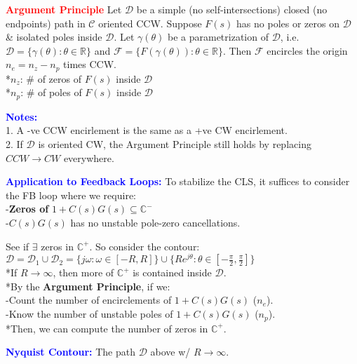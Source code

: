 \documentclass[5pt]{extarticle} %
\newcommand{\customFigure}[3][]{%
    \vspace{-1.5em}
    \begin{figure}[H]
        \centering
        \texttt{[image: \#2]}
    \end{figure}
    \vspace{-1.5em}
}
\begin{document}
\begin{paracol}{3}
{    \textcolor{red}{\textbf{Argument Principle}} Let $\mathcal{D}$ be a simple (no self-intersections) closed (no endpoints) path in $\mathcal{C}$ oriented CCW. 
    Suppose $F(s)$ has no poles or zeros on $\mathcal{D}$ \& isolated poles inside $\mathcal{D}$. Let $\gamma(\theta)$ be a parametrization of $\mathcal{D}$, i.e. $\mathcal{D} = \{ \gamma(\theta) : \theta \in \mathbb{R}\}$ 
    and $\mathcal{F} = \{F(\gamma(\theta)) : \theta \in \mathbb{R}\}$. Then $\mathcal{F}$ encircles the origin $n_e = n_z - n_p$ times CCW. \\
    *$n_z$: \# of zeros of $F(s)$ inside $\mathcal{D}$ \\
    *$n_p$: \# of poles of $F(s)$ inside $\mathcal{D}$ 

    \textcolor{blue}{\textbf{Notes:}} \\
    1. A -ve CCW encirlement is the same as a +ve CW encirlement. \\    
    2. If $\mathcal{D}$ is oriented CW, the Argument Principle still holds by replacing $CCW \rightarrow CW$ everywhere.

    \textcolor{blue}{\textbf{Application to Feedback Loops:}} To stabilize the CLS, it suffices to consider the FB loop where we require: \\
    -\textbf{Zeros of} \( 1 + C(s) G(s) \subseteq \mathbb{C}^- \) \textcolor{red}{} \\
    -\( C(s)G(s) \) has no unstable pole-zero cancellations. 
    
    See if $\exists$ zeros in \( \mathbb{C}^+ \). So consider the contour: \\
    $\mathcal{D} = \mathcal{D}_1 \cup \mathcal{D}_2 = \{ j\omega : \omega \in [-R, R] \} \cup \{ R e^{j\theta} : \theta \in [-\frac{\pi}{2}, \frac{\pi}{2}] \}$ \\
    *If \( R \to \infty \), then more of \( \mathbb{C}^+ \) is contained inside \( \mathcal{D} \). \\
    *By the \textbf{Argument Principle}, if we: \\
    -Count the number of encirclements of \( 1 + C(s)G(s) \) (\( n_e \)). \\
    -Know the number of unstable poles of \( 1 + C(s)G(s) \) (\( n_p \)). \\
    *Then, we can compute the number of zeros in \( \mathbb{C}^+ \).

    \textcolor{blue}{\textbf{Nyquist Contour:}} The path $\mathcal{D}$ above w/ $R \rightarrow \infty$. \\

}
\end{paracol}
\end{document}

